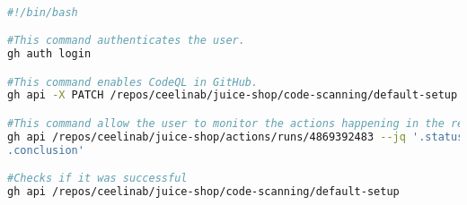 \newpage
\label{EnableCodeQL}
\begin{lstlisting}[language = bash, caption=Enable CodeQL]

#!/bin/bash

#This command authenticates the user.
gh auth login

#This command enables CodeQL in GitHub. 
gh api -X PATCH /repos/ceelinab/juice-shop/code-scanning/default-setup -f state=configured

#This command allow the user to monitor the actions happening in the repository. 
gh api /repos/ceelinab/juice-shop/actions/runs/4869392483 --jq '.status,
.conclusion'

#Checks if it was successful
gh api /repos/ceelinab/juice-shop/code-scanning/default-setup




\end{lstlisting}
